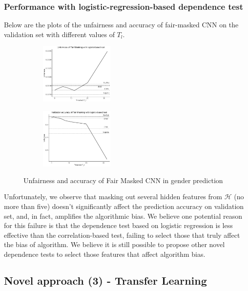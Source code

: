 \subsubsection*{Performance with logistic-regression-based dependence test}
Below are the plots of the unfairness and accuracy of fair-masked CNN on the validation set with different values of $T_l$.

\begin{figure}[H]
	\centering
	\begin{subfigure}
		\centering
		\includegraphics[width=0.4\textwidth]{figure/fairmasking-l-f.png}
	\end{subfigure}
	\quad
	\begin{subfigure}
		\centering
		\includegraphics[width=0.4\textwidth]{figure/fairmasking-l-a.png}
	\end{subfigure}
	\caption{Unfairness and accuracy of Fair Masked CNN in gender prediction}
	\label{fig: fairmasking}
\end{figure}
Unfortunately, we observe that masking out several hidden features from $\mathcal{H}$ (no more than five) doesn't significantly affect the prediction accuracy on validation set, and, in fact, amplifies the algorithmic bias. We believe one potential reason for this failure is that the dependence test based on logistic regression is less effective than the correlation-based test, failing to select those that truly affect the bias of algorithm. We believe it is still possible to propose other novel dependence tests to select those features that affect algorithm bias.


\subsection{Novel approach (3) - Transfer Learning}

